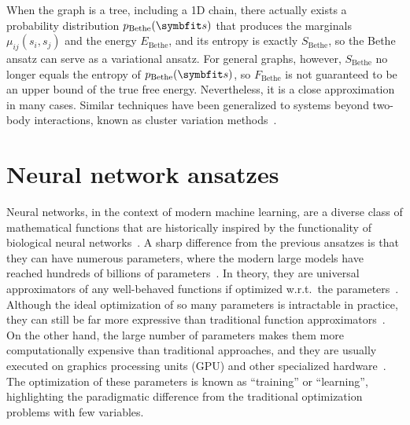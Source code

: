 When the graph is a tree, including a 1D chain, there actually exists a probability distribution $p_\text{Bethe}(\vs)$ that produces the marginals $\mu_{i j}(s_i, s_j)$ and the energy $E_\text{Bethe}$, and its entropy is exactly $S_\text{Bethe}$, so the Bethe ansatz can serve as a variational ansatz. For general graphs, however, $S_\text{Bethe}$ no longer equals the entropy of $p_\text{Bethe}(\vs)$, so $F_\text{Bethe}$ is not guaranteed to be an upper bound of the true free energy. Nevertheless, it is a close approximation in many cases. Similar techniques have been generalized to systems beyond two-body interactions, known as cluster variation methods~\cite{pelizzola2005cluster}.

\section{Neural network ansatzes}


Neural networks, in the context of modern machine learning, are a diverse class of mathematical functions that are historically inspired by the functionality of biological neural networks~\cite{mackay2003information, goodfellow2016deep}. A sharp difference from the previous ansatzes is that they can have numerous parameters, where the modern large models have reached hundreds of billions of parameters~\cite{brown2020language}. In theory, they are universal approximators of any well-behaved functions if optimized w.r.t.\ the parameters~\cite{hornik1989multilayer}. Although the ideal optimization of so many parameters is intractable in practice, they can still be far more expressive than traditional function approximators~\cite{sontag1998vc}. On the other hand, the large number of parameters makes them more computationally expensive than traditional approaches, and they are usually executed on graphics processing units (GPU) and other specialized hardware~\cite{chen2020survey}. The optimization of these parameters is known as ``training'' or ``learning'', highlighting the paradigmatic difference from the traditional optimization problems with few variables.

